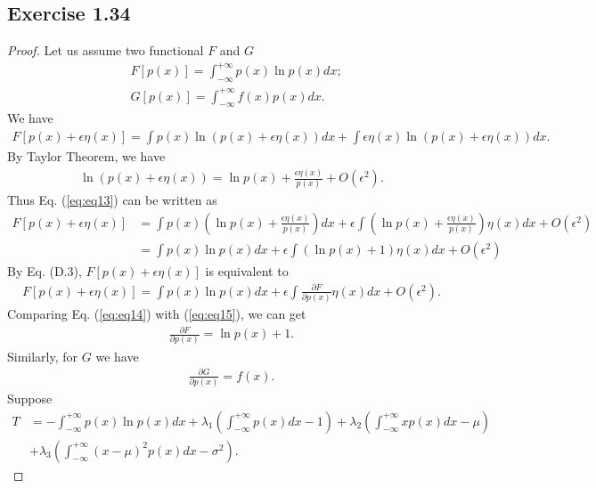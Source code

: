 \documentclass[11pt]{article}
\theoremstyle{definition}
\begin{document}
\subsection{Exercise 1.34}
\begin{proof}
Let us assume two functional $F$ and $G$
\begin{align*}
&F[p(x)] = \int^{+\infty}_{-\infty}p(x)\ln p(x)dx; \\
&G[p(x)] = \int^{+\infty}_{-\infty}f(x)p(x)dx.
\end{align*}
We have
\begin{align}
F[p(x) + \epsilon \eta(x)] = \int p(x)\ln (p(x) + \epsilon \eta(x))dx + \int\epsilon\eta(x)\ln(p(x) + \epsilon\eta(x))dx. \label{eq:eq13}
\end{align}
By Taylor Theorem, we have
\begin{align*}
\ln(p(x)+\epsilon\eta(x)) = \ln p(x) + \frac{\epsilon\eta(x)}{p(x)} + O(\epsilon^2).
\end{align*}
Thus Eq. (\ref{eq:eq13}) can be written as 
\begin{align}
F[p(x) + \epsilon \eta(x)] &= \int p(x)\left(\ln p(x)+\frac{\epsilon\eta(x)}{p(x)}\right)dx + \epsilon\int\left(\ln p(x)+\frac{\epsilon\eta(x)}{p(x)}\right)\eta(x)dx + O(\epsilon^2) \nonumber\\
&= \int p(x)\ln p(x)dx + \epsilon\int(\ln p(x)+1)\eta(x)dx + O(\epsilon^2) \label{eq:eq14}
\end{align}
By Eq. (D.3), $F[p(x) + \epsilon \eta(x)]$ is equivalent to
\begin{align}
F[p(x) + \epsilon \eta(x)] = \int p(x)\ln p(x)dx + \epsilon\int\frac{\partial F}{\partial p(x)}\eta(x)dx +  O(\epsilon^2). \label{eq:eq15}
\end{align}
Comparing Eq. (\ref{eq:eq14}) with (\ref{eq:eq15}), we can get
\begin{align}
\frac{\partial F}{\partial p(x)} = \ln p(x) + 1. \label{eq:eq16}
\end{align}
Similarly, for $G$ we have
\begin{align}
\frac{\partial G}{\partial p(x)} = f(x). \label{eq:eq17}
\end{align}
Suppose
\begin{align*}
T &= -\int^{+\infty}_{-\infty}p(x)\ln p(x)dx + \lambda_1\left(\int^{+\infty}_{-\infty}p(x)dx-1\right) + \lambda_2\left(\int^{+\infty}_{-\infty}xp(x)dx-\mu\right)\\ &+\lambda_3\left(\int^{+\infty}_{-\infty}(x-\mu)^2p(x)dx-\sigma^2\right).
\end{align*}

\end{proof}
\end{document}
